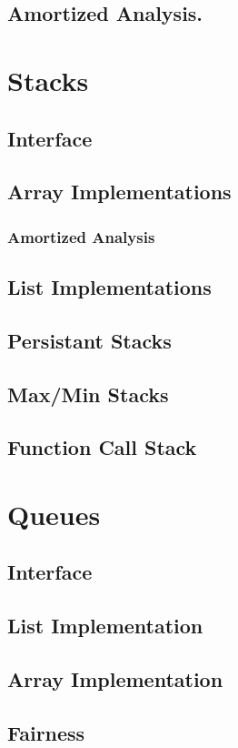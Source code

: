 \documentclass[12pt, letterpaper]{book}
\begin{document}
	\subsection{Amortized Analysis.}

\section{Stacks}
	\subsection{Interface}
	\subsection{Array Implementations}
		\subsubsection{Amortized Analysis}
	\subsection{List Implementations}
	\subsection{Persistant Stacks}
	\subsection{Max/Min Stacks}
	\subsection{Function Call Stack}

\section{Queues}
	\subsection{Interface}
	\subsection{List Implementation}
	\subsection{Array Implementation}
	\subsection{Fairness}
\end{document}
